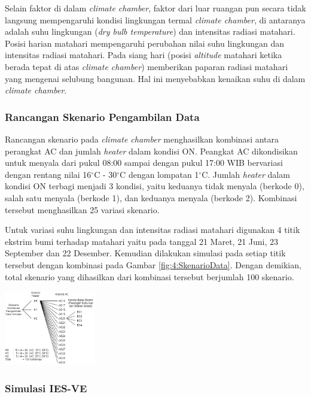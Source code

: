 \documentclass[a4paper,10pt]{article}
\makeatletter
\newenvironment{body}{\begin{multicols}{2}}{\end{multicols}}
\renewenvironment{figure}
{\def\@captype{figure}%
	\captionsetup{labelsep=period,format=hang,font=footnotesize,justification=justified}
}
{}
\makeatother
\begin{document}
\begin{body}
		Selain faktor di dalam \textit{climate chamber}, faktor dari luar ruangan pun secara tidak langsung mempengaruhi kondisi lingkungan termal \textit{climate chamber}, di antaranya adalah suhu lingkungan (\textit{dry bulb temperature}) dan intensitas radiasi matahari. Posisi harian matahari mempengaruhi perubahan nilai suhu lingkungan dan intensitas radiasi matahari. Pada siang hari (posisi \textit{altitude} matahari ketika berada tepat di atas \textit{climate chamber}) memberikan paparan radiasi matahari yang mengenai selubung bangunan. Hal ini menyebabkan kenaikan suhu di dalam \textit{climate chamber}.
		
		\subsubsection{Rancangan Skenario Pengambilan Data}
		Rancangan skenario pada \textit{climate chamber} menghasilkan kombinasi antara perangkat AC dan jumlah \textit{heater} dalam kondisi ON. Peangkat AC dikondisikan untuk menyala dari pukul 08:00 sampai dengan pukul 17:00 WIB bervariasi dengan rentang nilai 16$^\circ$C - 30$^\circ$C dengan lompatan 1$^\circ$C. Jumlah \textit{heater} dalam kondisi ON terbagi menjadi 3 kondisi, yaitu keduanya tidak menyala (berkode 0), salah satu menyala (berkode 1), dan keduanya menyala (berkode 2). Kombinasi tersebut menghasilkan 25 variasi skenario.
		
		Untuk variasi suhu lingkungan dan intensitas radiasi matahari digunakan 4 titik ekstrim bumi terhadap matahari yaitu pada tanggal 21 Maret, 21 Juni, 23 September dan 22 Desember. Kemudian dilakukan simulasi pada setiap titik tersebut dengan kombinasi pada Gambar \ref{fig:4:SkenarioData}. Dengan demikian, total skenario yang dihasilkan dari kombinasi tersebut berjumlah 100 skenario.
		
		\begin{figure}
			\centering
			\includegraphics[width=0.3\textwidth]{figures/SkenarioData}
			\caption{Skenario Pengambilan Data}
			\label{fig:4:SkenarioData}
		\end{figure}
		\vspace{1em}
		
		\subsubsection{Simulasi IES-VE}
		

\end{body}
\end{document}
